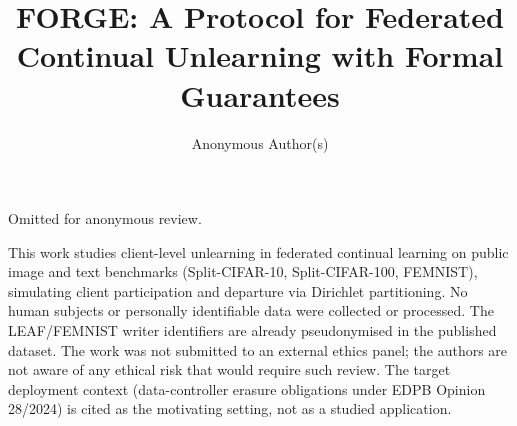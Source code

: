 \documentclass[sigconf,anonymous,review]{acmart}
\theoremstyle{definition}
\theoremstyle{remark}
\begin{document}
\title[FORGE: FCL with Formal Guarantees]{FORGE: A Protocol for Federated Continual Unlearning with Formal Guarantees}

\author{Anonymous Author(s)}

\renewcommand{\shortauthors}{Anonymous}




\maketitle













\begin{acks}
Omitted for anonymous review.
\end{acks}

\begin{ethics}
This work studies client-level unlearning in federated continual learning on
public image and text benchmarks (Split-CIFAR-10, Split-CIFAR-100, FEMNIST),
simulating client participation and departure via Dirichlet partitioning. No
human subjects or personally identifiable data were collected or processed. The
LEAF/FEMNIST writer identifiers are already pseudonymised in the published
dataset. The work was not submitted to an external ethics panel; the authors are
not aware of any ethical risk that would require such review. The target
deployment context (data-controller erasure obligations under EDPB Opinion
28/2024) is cited as the motivating setting, not as a studied application.
\end{ethics}
\end{document}
